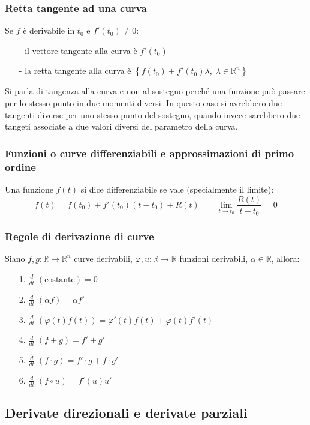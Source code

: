 \documentclass[a4paper]{article}
\newcommand\R{\mathbb{R}}     %
\newcommand\Rn{\mathbb{R}^n}  %
\newcommand\dt{\frac{d}{dt}}  %
\begin{document}
\subsubsection*{Retta tangente ad una curva}
Se \(f\) è derivabile in \(t_0\) e \(f'(t_0) \neq 0\):
\begin{itemize}[topsep=3pt, itemsep=0pt]
	\item[-] il vettore tangente alla curva è \(f'(t_0)\)
	\item[-] la retta tangente alla curva è \(\left\{ f(t_0) + f'(t_0) \lambda, \; \lambda \in \Rn \right\}\)
\end{itemize}
Si parla di tangenza alla curva e non al sostegno perché una funzione può passare per lo stesso punto in due momenti diversi. In
questo caso si avrebbero due tangenti diverse per uno stesso punto del sostegno, quando invece sarebbero due tangeti associate a
due valori diversi del parametro della curva.

\subsubsection*{Funzioni o curve differenziabili e approssimazioni di primo ordine}
Una funzione \(f(t)\) si dice differenziabile se vale (specialmente il limite):
\[f(t) = f(t_0) + f'(t_0) (t-t_0) + R(t) \qquad \lim_{t \to t_0} \frac{R(t)}{t-t_0} = 0\]

\subsubsection*{Regole di derivazione di curve}
Siano \(f,g : \R \to \Rn\) curve derivabili, \(\varphi,u : \R \to \R\) funzioni derivabili, \(\alpha \in \R\), allora:
\begin{itemize}[topsep=3pt, itemsep=0pt]
	\item[1.] \(\dt \; \left(\text{costante}\right) = 0\)
	\item[2.] \(\dt \; \left(\alpha f\right) = \alpha f'\)
	\item[3.] \(\dt \; \left(\varphi(t)f(t)\right) = \varphi'(t)f(t) + \varphi(t)f'(t)\)
	\item[4.] \(\dt \; \left(f + g\right) = f' + g'\)
	\item[5.] \(\dt \; \left(f \cdot g\right) = f' \cdot g + f \cdot g'\)
	\item[6.] \(\dt \; \left(f \circ u\right) = f'(u)u'\)
\end{itemize}

\subsection{Derivate direzionali e derivate parziali}
\end{document}
